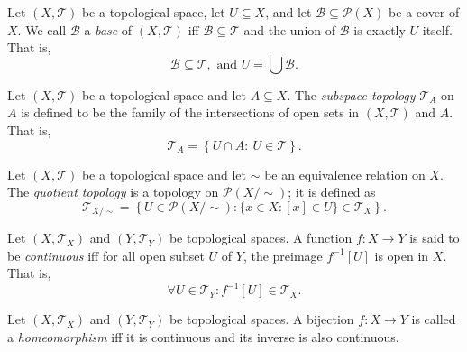 \begin{definition}
	[basis]
	\label{def: basis}
	Let $(X, \mathcal T)$ be a topological space, let $U \subseteq X$, and let $\mathcal B \subseteq \mathcal P(X)$ be a cover of $X$. We call $\mathcal B$ a \textit{base} of $(X, \mathcal T)$ iff $\mathcal B \subseteq \mathcal T$ and the union of $\mathcal B$ is exactly $U$ itself. That is,
	$$
	\mathcal B \subseteq \mathcal T, \text{ and } U = \bigcup \mathcal B.
	$$
\end{definition}


\begin{definition}
	\label{def: subspace topology}
	Let $(X, \mathcal T)$ be a topological space and let $A \subseteq X$. The \textit{subspace topology} $\mathcal T_A$ on $A$ is defined to be the family of the intersections of open sets in $(X, \mathcal T)$ and $A$. That is,
	$$
	\mathcal T_A = \left\{ U \cap A : \ U \in \mathcal T \right\}.
	$$
\end{definition}


\begin{definition}
	\label{def: quotient topology}
	Let $(X, \mathcal T)$ be a topological space and let $\sim$ be an equivalence relation on $X$. The \textit{quotient topology} is a topology on $\mathcal P(X/ \sim)$; it is defined as
	$$
	\mathcal T_{X / \sim} = \left\{ U \in \mathcal P(X/\sim) : \{ x \in X: [x] \in U \} \in \mathcal T_X \right\}.
	$$
\end{definition}


\begin{definition}
	\label{def: continuous functions}
	Let $(X, \mathcal T_X)$ and $(Y, \mathcal T_Y)$ be topological spaces. A function $f: X \to Y$ is said to be \textit{continuous} iff for all open subset $U$ of $Y$, the preimage $f^{-1}[U]$ is open in $X$. That is,
	$$
	\forall U \in \mathcal T_{Y} : f^{-1}[U] \in \mathcal T_X.
	$$
\end{definition}


\begin{definition}
	[homeomorphisms]
	\label{def: homomorphisms}
	Let $(X, \mathcal T_X)$ and $(Y, \mathcal T_Y)$ be topological spaces. A bijection $f: X \to Y$ is called a \textit{homeomorphism} iff it is continuous and its inverse is also continuous.
\end{definition}


